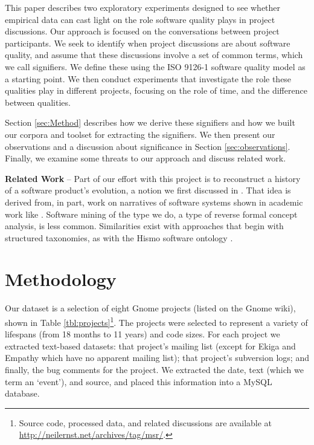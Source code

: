 \documentclass[conference, compsoc]{IEEEtran}
\begin{document}
This paper describes two exploratory experiments designed to see whether empirical data can cast light on the role software quality plays in project discussions. Our approach is focused on the conversations between project participants. We seek to identify when project discussions are about software quality, and assume that these discussions involve a set of common terms, which we call signifiers. We define these using the ISO 9126-1 software quality model \cite{iso9126} as a starting point. We then conduct experiments that investigate the role these qualities play in different projects, focusing on the role of time, and the difference between qualities. 
	
Section \ref{sec:Method} describes how we derive these signifiers and how we built our corpora and toolset for extracting the signifiers. We then present our observations and a discussion about significance in Section \ref{sec:observations}. Finally, we examine some threats to our approach and discuss related work. 

\noindent\textbf{Related Work} -- Part of our effort with this project is to reconstruct a history of a software product's evolution, a notion we first discussed in \cite{Ernst07icsm}. That idea is derived from, in part, work on narratives of software systems shown in academic work like \cite{Anton2001}. %
Software mining of the type we do, a type of reverse formal concept analysis, is less common. Similarities exist with approaches that begin with structured taxonomies, as with the Hismo software ontology \cite{Girba2006}.
	
\vspace{-2mm}
\section{Methodology}
\vspace{-2mm}
\label{sec:Method}
Our dataset is a selection of eight Gnome projects (listed on the Gnome wiki), shown in Table \ref{tbl:projects}\footnote{Source code, processed data, and related discussions are available at \url{http://neilernst.net/archives/tag/msr/}.}. The projects were selected to represent a variety of lifespans (from 18 months to 11 years) and code sizes. For each project we extracted text-based datasets: that project's mailing list (except for Ekiga and Empathy which have no apparent mailing list); that project's subversion logs; and finally, the bug comments for the project. We extracted the date, text (which we term an `event'), and source, and placed this information into a MySQL database.
\end{document}
